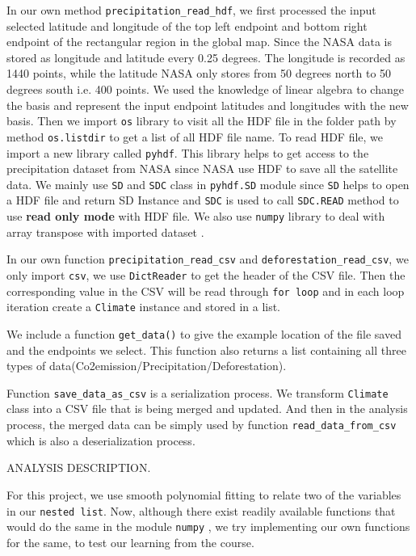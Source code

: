 \documentclass[12pt]{article}
\begin{document}
\begin{enumerate}
\begin{text}
In our own method \texttt{precipitation\_read\_hdf}, we first processed the input selected latitude and longitude of the top left endpoint and bottom right endpoint of the rectangular region in the global map. Since the NASA data is stored as longitude and latitude every 0.25 degrees. The longitude is recorded as 1440 points, while the latitude NASA only stores from 50 degrees north to 50 degrees south i.e. 400 points\citep{N3B43}. We used the knowledge of linear algebra to change the basis and represent the input endpoint latitudes and longitudes with the new basis.
Then we import \texttt{os} library to visit all the HDF file in the folder path by method \texttt{os.listdir} to get a list of all HDF file name\citep{PytOS}. To read HDF file, we import a new library called \texttt{pyhdf}. This library helps to get access to the precipitation dataset from NASA since NASA use HDF to save all the satellite data. We mainly use \texttt{SD} and \texttt{SDC} class in \texttt{pyhdf.SD} module since \texttt{SD} helps to open a HDF file and return SD Instance and \texttt{SDC} is used to call \texttt{SDC.READ} method to use \textbf{read only mode} with HDF file\citep{Pyhdf}. We also use \texttt{numpy} library to deal with array transpose with imported dataset \citep{Pynpy}.

In our own function \texttt{precipitation\_read\_csv} and \texttt{deforestation\_read\_csv}, we only import \texttt{csv}, we use \texttt{DictReader} to get the header of the CSV file\citep{Pycsv}. Then the corresponding value in the CSV will be read through \texttt{for loop} and in each loop iteration create a \texttt{Climate} instance and stored in a list.

We include a function \texttt{get\_data()} to give the example location of the file saved and the endpoints we select. This function also returns a list containing all three types of data(Co2emission/Precipitation/Deforestation).

Function \texttt{save\_data\_as\_csv} is a serialization process. We transform \texttt{Climate} class into a CSV file that is being merged and updated. And then in the analysis process, the merged data can be simply used by function \texttt{read\_data\_from\_csv} which is also a deserialization process.


ANALYSIS DESCRIPTION.

For this project, we use smooth polynomial fitting to relate two of the variables in our \texttt{nested list}. Now, although there exist readily available functions that would do the same in the module \texttt{numpy} \citep{Sci20}, we try implementing our own functions for the same, to test our learning from the course.


\end{text}
\end{enumerate}
\end{document}
